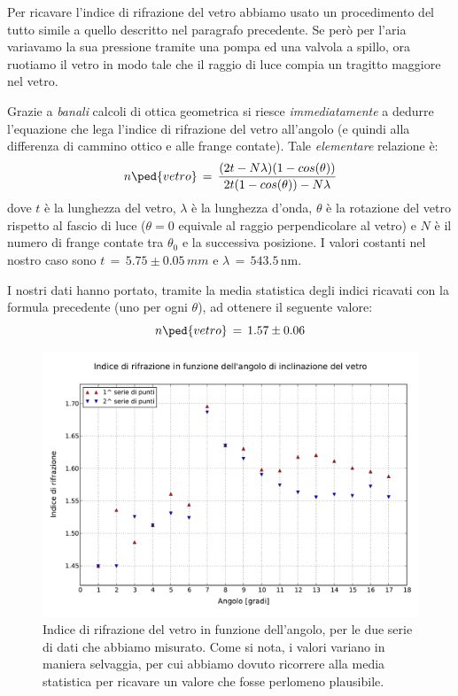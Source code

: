 Per ricavare l'indice di rifrazione del vetro abbiamo usato un procedimento del tutto simile a quello descritto nel paragrafo precedente.
Se però per l'aria variavamo la sua pressione tramite una pompa ed una valvola a spillo, ora ruotiamo il vetro in modo tale che il raggio di luce compia un tragitto maggiore nel vetro. %

Grazie a \emph{banali} calcoli di ottica geometrica si riesce \emph{immediatamente} a dedurre l'equazione che lega l'indice di rifrazione del vetro all'angolo (e quindi alla differenza di cammino ottico e alle frange contate). Tale \emph{elementare} relazione è:
\begin{equation}
	n\ped{vetro} \, = \, \frac{(2t - N \lambda) (1 - cos(\theta))}{2t(1-cos(\theta))-N\lambda}
\end{equation}
dove $t$ è la lunghezza del vetro, $\lambda$ è la lunghezza d'onda, $\theta$ è la rotazione del vetro rispetto al fascio di luce
($\theta = 0$ equivale al raggio perpendicolare al vetro)
e $N$ è il numero di frange contate tra $\theta_0$ e la successiva posizione.
I valori costanti nel nostro caso sono $t \,=\, 5.75 \pm 0.05 \, mm$ e $\lambda \, = \, 543.5 \, \si{\nano\metre}$.

I nostri dati hanno portato, tramite la media statistica degli indici ricavati con la formula precedente (uno per ogni $\theta$),
ad ottenere il seguente valore:
\begin{equation}
	n\ped{vetro} \, = \, 1.57 \pm 0.06
\end{equation}

\begin{figure}[t]
    \centering
        \includegraphics[width=\textwidth]{lol.pdf}
        \caption{Indice di rifrazione del vetro in funzione dell'angolo, per le due serie di dati che abbiamo misurato.
            Come si nota, i valori variano in maniera selvaggia, per cui abbiamo dovuto ricorrere alla media statistica per
        ricavare un valore che fosse perlomeno plausibile.}
        \label{fig:enne_theta}
\end{figure}
